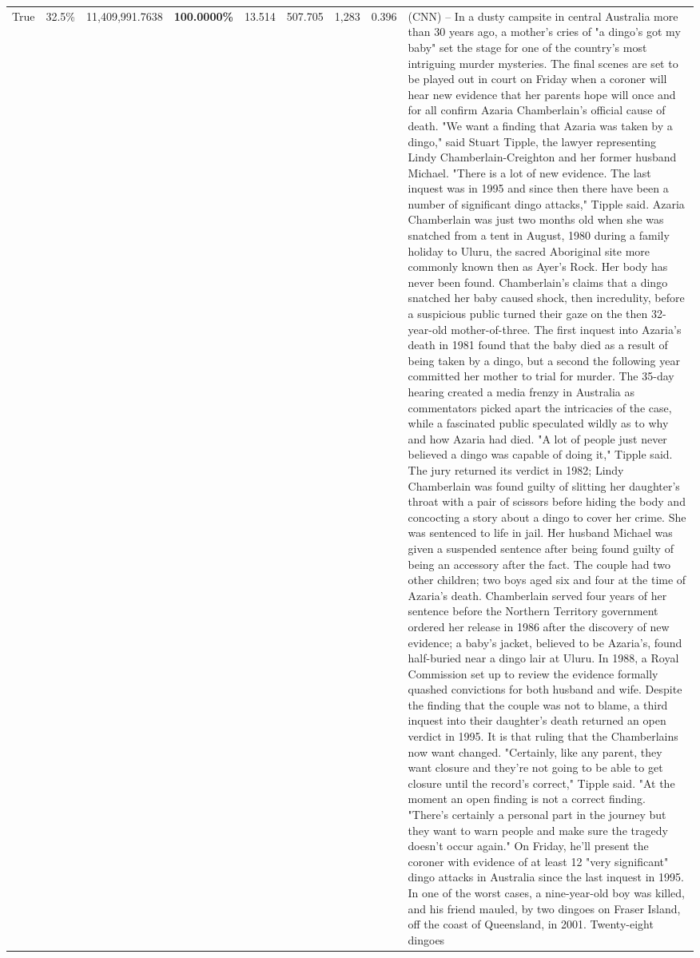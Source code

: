 \begin{table}[H]
\begin{tabular}{lllrlllll}
True & 32.5\% & 11,409,991.7638 & \bfseries \color{red} 100.0000\% & 13.514 & 507.705 & 1,283 & 0.396 & (CNN) -- In a dusty campsite in central Australia more than 30 years ago, a mother's cries of "a dingo's got my baby" set the stage for one of the country's most intriguing murder mysteries. The final scenes are set to be played out in court on Friday when a coroner will hear new evidence that her parents hope will once and for all confirm Azaria Chamberlain's official cause of death. "We want a finding that Azaria was taken by a dingo," said Stuart Tipple, the lawyer representing Lindy Chamberlain-Creighton and her former husband Michael. "There is a lot of new evidence. The last inquest was in 1995 and since then there have been a number of significant dingo attacks," Tipple said. Azaria Chamberlain was just two months old when she was snatched from a tent in August, 1980 during a family holiday to Uluru, the sacred Aboriginal site more commonly known then as Ayer's Rock. Her body has never been found. Chamberlain's claims that a dingo snatched her baby caused shock, then incredulity, before a suspicious public turned their gaze on the then 32-year-old mother-of-three. The first inquest into Azaria's death in 1981 found that the baby died as a result of being taken by a dingo, but a second the following year committed her mother to trial for murder. The 35-day hearing created a media frenzy in Australia as commentators picked apart the intricacies of the case, while a fascinated public speculated wildly as to why and how Azaria had died. "A lot of people just never believed a dingo was capable of doing it," Tipple said. The jury returned its verdict in 1982; Lindy Chamberlain was found guilty of slitting her daughter's throat with a pair of scissors before hiding the body and concocting a story about a dingo to cover her crime. She was sentenced to life in jail. Her husband Michael was given a suspended sentence after being found guilty of being an accessory after the fact. The couple had two other children; two boys aged six and four at the time of Azaria's death. Chamberlain served four years of her sentence before the Northern Territory government ordered her release in 1986 after the discovery of new evidence; a baby's jacket, believed to be Azaria's, found half-buried near a dingo lair at Uluru. In 1988, a Royal Commission set up to review the evidence formally quashed convictions for both husband and wife. Despite the finding that the couple was not to blame, a third inquest into their daughter's death returned an open verdict in 1995. It is that ruling that the Chamberlains now want changed. "Certainly, like any parent, they want closure and they're not going to be able to get closure until the record's correct," Tipple said. "At the moment an open finding is not a correct finding. "There's certainly a personal part in the journey but they want to warn people and make sure the tragedy doesn't occur again." On Friday, he'll present the coroner with evidence of at least 12 "very significant" dingo attacks in Australia since the last inquest in 1995. In one of the worst cases, a nine-year-old boy was killed, and his friend mauled, by two dingoes on Fraser Island, off the coast of Queensland, in 2001. Twenty-eight dingoes 
\end{tabular}
\end{table}
